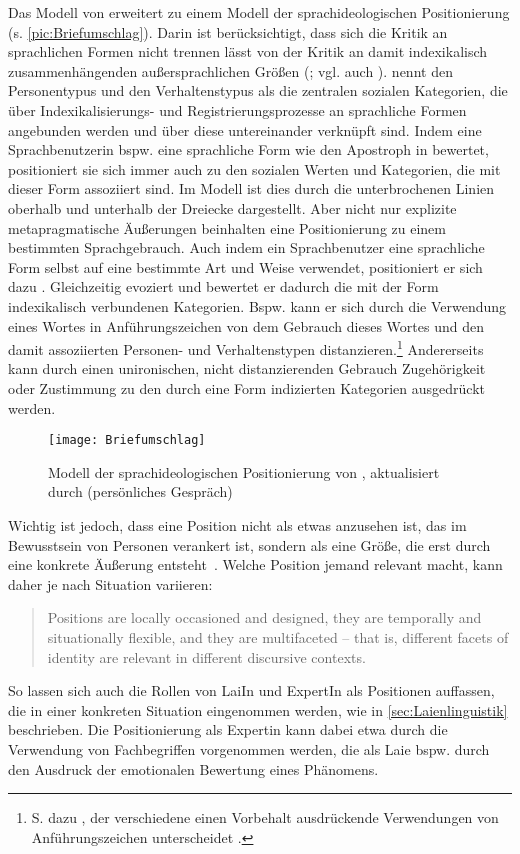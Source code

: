 Das Modell von \citet{DuBois.2007} erweitert \citet[273]{Spitzmuller2013} zu einem Modell der sprachideologischen Positionierung (s. \autoref{pic:Briefumschlag}). 
Darin ist berücksichtigt, dass sich die Kritik an sprachlichen Formen nicht trennen lässt von der Kritik an damit indexikalisch zusammenhängenden außersprachlichen Größen (\citealp[s.][257]{Spitzmuller.2005}; vgl. auch \citealp[1]{Gal.2019}). \citet[272]{Spitzmuller2013} nennt den Personentypus und den Verhaltenstypus als die zentralen sozialen Kategorien, die über Indexikalisierungs- und Registrierungsprozesse an sprachliche Formen angebunden werden und über diese untereinander verknüpft sind. 
Indem eine Sprachbenutzerin bspw. eine sprachliche Form wie den Apostroph in  bewertet, positioniert sie sich immer auch zu den sozialen Werten und Kategorien, die mit dieser Form assoziiert sind.
Im Modell ist dies durch die unterbrochenen Linien oberhalb und unterhalb der Dreiecke dargestellt. 
Aber nicht nur explizite metapragmatische Äußerungen beinhalten eine Positionierung zu einem bestimmten Sprachgebrauch. 
Auch indem ein Sprachbenutzer eine sprachliche Form selbst auf eine bestimmte Art und Weise verwendet, positioniert er sich dazu \citep[s.][270]{Spitzmuller2013}. 
Gleichzeitig evoziert und bewertet er dadurch die mit der Form indexikalisch verbundenen Kategorien. 
Bspw. kann er sich durch die Verwendung eines Wortes in Anführungszeichen von dem Gebrauch dieses Wortes und den damit assoziierten Personen- und Verhaltenstypen distanzieren.\footnote{S. dazu \citet[]{Klockow.1980}, der verschiedene einen Vorbehalt ausdrückende Verwendungen von Anführungszeichen unterscheidet \citep[vgl. auch][]{Bredel.2011}.}
Andererseits kann durch einen unironischen, nicht distanzierenden Gebrauch Zugehörigkeit oder Zustimmung zu den durch eine Form indizierten Kategorien ausgedrückt werden.
\begin{figure}
\centering
\texttt{[image: Briefumschlag]}
\caption{Modell der sprachideologischen Positionierung von \citet[273]{Spitzmuller2013}, aktualisiert durch \citeauthor{Spitzmuller2013} (persönliches Gespräch)}
\label{pic:Briefumschlag}
\end{figure}

Wichtig ist jedoch, dass eine Position nicht als etwas anzusehen ist, das im Bewusstsein von Personen verankert ist, sondern als eine Größe, die erst durch eine konkrete Äußerung entsteht~\citep[s.][369--370]{Deppermann.2015}. 
Welche Position jemand relevant macht, kann daher je nach Situation variieren: 
\begin{quote}Positions are locally occasioned and designed, they are temporally and situationally flexible, and they are multifaceted – that is, different facets of identity are relevant in different discursive contexts. \citep[370]{Deppermann.2015}\end{quote}
So lassen sich auch die Rollen von LaiIn und ExpertIn als Positionen auffassen, die in einer konkreten Situation eingenommen werden, wie in \autoref{sec:Laienlinguistik} beschrieben. Die Positionierung als Expertin kann dabei etwa durch die Verwendung von Fachbegriffen vorgenommen werden, die als Laie bspw. durch den Ausdruck der emotionalen Bewertung eines Phänomens. 


